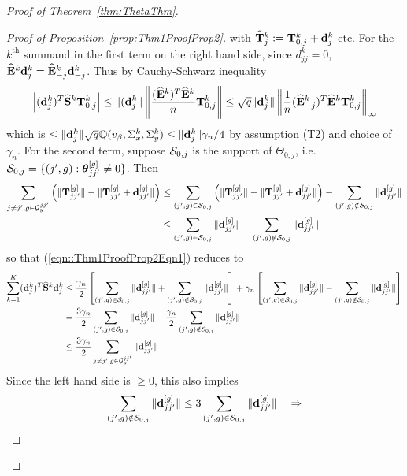\documentclass[12pt, letterpaper]{article}
\theoremstyle{definition}
\numberwithin{equation}{section}
\begin{document}
\begin{proof}[Proof of Theorem~\ref{thm:ThetaThm}]
\begin{proof}[Proof of Proposition~\ref{prop:Thm1ProofProp2}]
%
with $\widehat {{\mathbf{T}}}_j^k := {\mathbf{T}}_{0,j}^k + {\bf{d}}_{j}^k$ etc. For the $k^\text{th}$ summand in the first term on the right hand side, since $d_{jj}^k = 0$, $\widehat {{\mathbf{E}}}^k {\bf{d}}_j^k = \widehat {{\mathbf{E}}}_{-j}^k {\bf{d}}_{-j}^k$. Thus by Cauchy-Schwarz inequality
%
$$
\left| ({\bf{d}}_j^k)^T \widehat {{\mathbf{S}}}^k {\mathbf{T}}_{0,j}^k \right| \leq
\| ({\bf{d}}_j^k \| \left\| \frac{ (\widehat {{\mathbf{E}}}^k)^T \widehat {{\mathbf{E}}}^k }{n} {\mathbf{T}}_{0,j}^k \right\| \leq
\sqrt{q} \| {\bf{d}}_j^k \| \left\| \frac{1}{n} (\widehat {{\mathbf{E}}}_{-j}^k)^T \widehat {{\mathbf{E}}}^k {\mathbf{T}}_{0,j}^k \right\|_\infty
$$
%
which is $\leq \| {\bf{d}}_j^k\| \sqrt q {\mathbb{Q}}(v_\beta, \Sigma_x^k, \Sigma_y^k) \leq \| {\bf{d}}_j^k\| \gamma_n/4 $ by assumption (T2) and choice of $\gamma_n$. For the second term, 
suppose ${\cal{S}}_{0,j}$ is the support of $\Theta_{0,j}$, i.e. ${\cal{S}}_{0,j} = \{ (j',g): {\boldsymbol{\theta}}_{jj'}^{[g]} \neq 0 \}$. Then
%
\begin{align*}
\sum_{j \neq j', g \in {\cal{G}}_y^{jj'}} \left( \| {\mathbf{T}}_{jj'}^{[g]} \| -  \| {\mathbf{T}}_{jj'}^{[g]} + {\bf{d}}_{jj'}^{[g]}\| \right) & \leq
\sum_{(j',g) \in {\cal{S}}_{0,j}} \left( \| {\mathbf{T}}_{jj'}^{[g]} \| -  \| {\mathbf{T}}_{jj'}^{[g]} + {\bf{d}}_{jj'}^{[g]}\| \right) -
\sum_{(j',g) \notin {\cal{S}}_{0,j}} \| {\bf{d}}_{jj'}^{[g]} \|\\
& \leq \sum_{(j',g) \in {\cal{S}}_{0,j}} \| {\bf{d}}_{jj'}^{[g]} \| - \sum_{(j',g) \notin {\cal{S}}_{0,j}} \| {\bf{d}}_{jj'}^{[g]} \|
\end{align*}
so that (\ref{eqn::Thm1ProofProp2Eqn1}) reduces to
%
\begin{align}\label{eqn:Thm1ProofProp2Eqn3}
\sum_{k=1}^K ({\bf{d}}_j^k)^T \widehat {{\mathbf{S}}}^k {\bf{d}}_j^k & \leq 
\frac{\gamma_n}{2} \left[ \sum_{(j',g) \in {\cal{S}}_{0,j}} \| {\bf{d}}_{jj'}^{[g]} \| + \sum_{(j',g) \notin {\cal{S}}_{0,j}} \| {\bf{d}}_{jj'}^{[g]} \| \right] +
\gamma_n \left[ \sum_{(j',g) \in {\cal{S}}_{0,j}} \| {\bf{d}}_{jj'}^{[g]} \| - \sum_{(j',g) \notin {\cal{S}}_{0,j}} \| {\bf{d}}_{jj'}^{[g]} \| \right] \notag\\
& = \frac{3 \gamma_n}{2} \sum_{(j',g) \in {\cal{S}}_{0,j}} \| {\bf{d}}_{jj'}^{[g]} \| - \frac{\gamma_n}{2} \sum_{(j',g) \notin {\cal{S}}_{0,j}} \| {\bf{d}}_{jj'}^{[g]} \| \notag\\
& \leq \frac{3 \gamma_n}{2} \sum_{j \neq j', g \in {\cal{G}}_y^{jj'}} \| {\bf{d}}_{jj'}^{[g]} \|
\end{align}
%
Since the left hand side is $\geq 0$, this also implies
%
$$
\sum_{(j',g) \notin {\cal{S}}_{0,j}} \| {\bf{d}}_{jj'}^{[g]} \| \leq 3 \sum_{(j',g) \in {\cal{S}}_{0,j}} \| {\bf{d}}_{jj'}^{[g]} \| \quad \Rightarrow
$$
\end{proof}
\end{proof}
\end{document}
